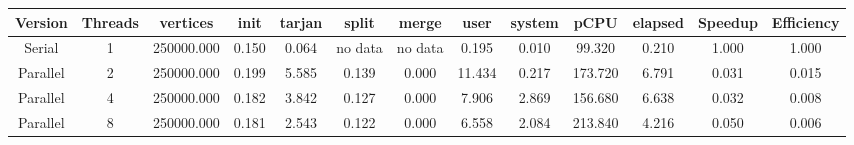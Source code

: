 \begin{tabular}{|c|c|c|c|c|c|c|c|c|c|c|c|c|}
\toprule
 Version &  Threads &   vertices &  init &  tarjan &   split &   merge &   user &  system &    pCPU &  elapsed &  Speedup &  Efficiency \\
\midrule
  Serial &        1 & 250000.000 & 0.150 &   0.064 & no data & no data &  0.195 &   0.010 &  99.320 &    0.210 &    1.000 &       1.000 \\
Parallel &        2 & 250000.000 & 0.199 &   5.585 &   0.139 &   0.000 & 11.434 &   0.217 & 173.720 &    6.791 &    0.031 &       0.015 \\
Parallel &        4 & 250000.000 & 0.182 &   3.842 &   0.127 &   0.000 &  7.906 &   2.869 & 156.680 &    6.638 &    0.032 &       0.008 \\
Parallel &        8 & 250000.000 & 0.181 &   2.543 &   0.122 &   0.000 &  6.558 &   2.084 & 213.840 &    4.216 &    0.050 &       0.006 \\
\bottomrule
\end{tabular}
